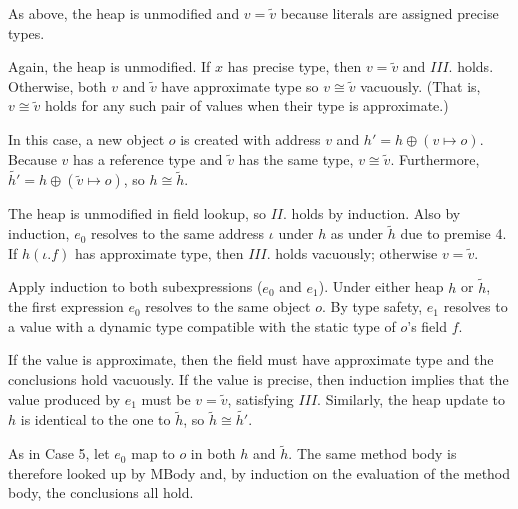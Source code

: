 
As above, the heap is unmodified and $v = \tilde{v}$ because literals are
assigned precise types.


Again, the heap is unmodified. If $x$ has precise type, then $v = \tilde{v}$ and
$III.$ holds. Otherwise, both $v$ and $\tilde{v}$ have approximate type so
$v \cong \tilde{v}$ vacuously. (That is, $v \cong \tilde{v}$ holds for any such
pair of values when their type is approximate.)


In this case, a new
object $o$ is created with address $v$ and
$h' = h \oplus (v \mapsto o)$. Because $v$ has a reference type and $\tilde{v}$
has the same type, $v \cong \tilde{v}$. Furthermore,
$\tilde{h'} = h \oplus (\tilde{v} \mapsto o)$, so $h \cong \tilde{h}$.


The heap is unmodified in field lookup, so $II.$ holds by induction. Also by
induction, $e_0$ resolves to the same address $\iota$ under $h$ as under
$\tilde{h}$ due to premise 4. If $h(\iota.f)$ has approximate type,
then $III.$ holds vacuously; otherwise $v = \tilde{v}$.


Apply induction to both subexpressions ($e_0$ and $e_1$). Under either heap $h$
or $\tilde{h}$, the first expression $e_0$ resolves to the same object $o$. By
type safety, $e_1$ resolves to a value with a dynamic type compatible
with the static type of $o$'s field $f$.

If the value is approximate, then the field must have approximate type and the
conclusions hold vacuously. If the value is precise, then induction implies that
the value produced by $e_1$ must be $v = \tilde{v}$, satisfying $III.$
Similarly, the heap update to $h$ is identical to the one to $\tilde{h}$, so
$\tilde{h} \cong \tilde{h'}$.


As in Case 5, let $e_0$ map to $o$ in both $h$ and $\tilde{h}$. The same method
body is therefore looked up by $\mathrm{MBody}$ and, by induction on the
evaluation of the method body, the conclusions all hold.

